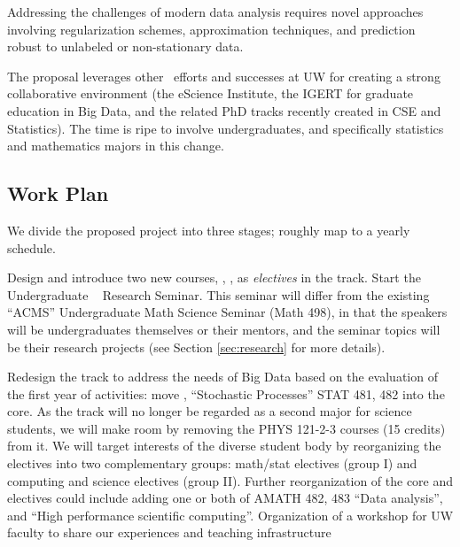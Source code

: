   Addressing the challenges of modern data analysis requires novel approaches
  involving regularization schemes, approximation techniques, and prediction
  robust to unlabeled or non-stationary data.
\item The proposal leverages other \cdse\ efforts and successes at UW for creating a strong collaborative environment (the eScience Institute, the IGERT for graduate education in Big Data, and the related PhD tracks recently created in CSE and Statistics). The time is ripe to involve undergraduates, and specifically statistics and mathematics majors in this change.
\eit

\subsection{Work Plan}

\noindent We divide the proposed project into three stages; roughly map to a yearly schedule.

 Design and introduce two new courses,
\statcl, \astrocl,
as {\em electives} in the track.  Start the Undergraduate \cdse~
Research Seminar. This seminar will differ from the existing ``ACMS''
Undergraduate Math Science Seminar ({\sc Math 498}), in that the
speakers will be undergraduates themselves or their mentors, and the
seminar topics will be their research projects (see Section
\ref{sec:research} for more details).

 Redesign the track to address the needs of Big Data
based on the evaluation of the first year of activities: move \statcl,
``Stochastic Processes'' {\sc STAT 481, 482} into the core. As the track
will no longer be regarded as a second major for science students, we
will make room by removing the {\sc PHYS 121-2-3} courses (15 credits)
from it.  We will target interests of the diverse student body
by reorganizing the electives into two complementary groups:
math/stat electives (group I) and computing and science electives
(group II).  Further reorganization of the core and electives could include
adding one or both of {\sc AMATH 482, 483} ``Data analysis'', and
``High performance scientific computing''.
Organization of a workshop for UW faculty to share our experiences and
teaching infrastructure

